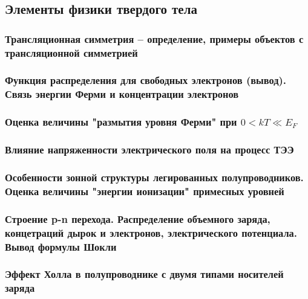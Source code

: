 \subsection{Элементы физики твердого тела}

\subsubsection{Трансляционная симметрия --  определение, примеры объектов с трансляционной симметрией}

\subsubsection{Функция распределения для свободных электронов (вывод). Связь энергии Ферми и концентрации электронов}

\subsubsection{Оценка величины "размытия уровня Ферми" при $0 < kT \ll E_F$}

\subsubsection{Влияние напряженности электрического поля на процесс ТЭЭ}

\subsubsection{Особенности зонной структуры легированных полупроводников. Оценка величины "энергии ионизации" примесных уровней}

\subsubsection{Строение p-n перехода. Распределение объемного заряда, концетраций дырок и электронов, электрического потенциала. Вывод формулы Шокли}

\subsubsection{Эффект Холла в полупроводнике с двумя типами носителей заряда}

